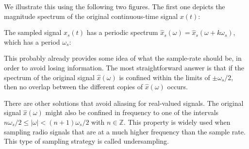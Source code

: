 We illustrate this using the following two figures. The first one depicts the magnitude 
spectrum of the original continuous-time signal $x(t)$:
\begin{center}
\end{center}
The sampled signal $x_s(t)$ has a periodic spectrum $\hat{x}_s(\omega)
  = \hat{x}_s(\omega+k\omega_s)$, which has a period $\omega_s$:
\begin{center}
\end{center}
This probably already provides some idea of what the sample-rate should be, in order to 
avoid losing information. The most straightforward answer is that if the spectrum of the 
original signal $\hat{x}(\omega)$ is confined within the limits of $\pm \omega_s/2$, 
then no overlap between the different copies of $\hat{x}(\omega)$ occurs.

There are other solutions that avoid aliasing for real-valued signals. The original 
signal $\hat{x}(\omega)$ might also be confined in frequency to one of 
the intervals $n \omega_s/2 \le |\omega| < (n+1)\omega_s/2$ with $n\in\mathbb{Z}$.
This property is widely used when sampling radio signals that are at a much higher 
frequency than the sample rate. This type of sampling strategy is called undersampling.

